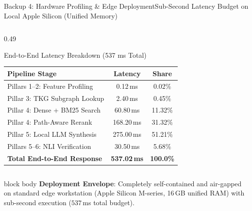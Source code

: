 \documentclass[aspectratio=169,10pt]{beamer}
\begin{document}
\begin{frame}{Backup 4: Hardware Profiling \& Edge Deployment}{Sub-Second Latency Budget on Local Apple Silicon (Unified Memory)}
\begin{columns}[T]
    \begin{column}{0.49\textwidth}
      \begin{exampleblock}{End-to-End Latency Breakdown (537 ms Total)}
        \centering\scriptsize
        \setlength{\tabcolsep}{3.0pt}
        \renewcommand{\arraystretch}{0.78}
        \begin{tabular}{@{}lcc@{}}
          \toprule
          \textbf{Pipeline Stage} & \textbf{Latency} & \textbf{Share} \\
          \midrule
          Pillars 1--2: Feature Profiling & 0.12\,ms & 0.02\% \\
          Pillar 3: TKG Subgraph Lookup & 2.40\,ms & 0.45\% \\
          Pillar 4: Dense + BM25 Search & 60.80\,ms & 11.32\% \\
          Pillar 4: Path-Aware Rerank & 168.20\,ms & 31.32\% \\
          Pillar 5: Local LLM Synthesis & 275.00\,ms & 51.21\% \\
          Pillars 5--6: NLI Verification & 30.50\,ms & 5.68\% \\
          \midrule
          \textbf{Total End-to-End Response} & \textbf{537.02\,ms} & \textbf{100.0\%} \\
          \bottomrule
        \end{tabular}
      \end{exampleblock}
    \end{column}
  \end{columns}

  \vspace{0.8ex}
  \begin{beamercolorbox}[wd=\textwidth,rounded=true,sep=0.35ex,center]{block body}
    \scriptsize\textbf{Deployment Envelope}: Completely self-contained and air-gapped on standard edge workstation (Apple Silicon M-series, 16\,GB unified RAM) with sub-second execution ($537$\,ms total budget).
  \end{beamercolorbox}
\end{frame}
\end{document}
